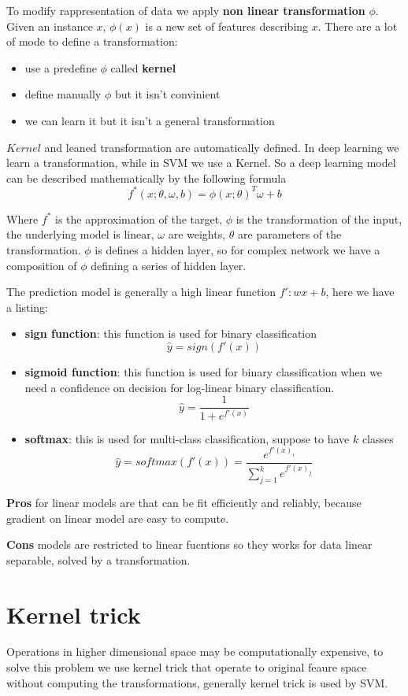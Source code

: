 To modify rappresentation of data we apply \textbf{non linear transformation} $\phi$.
Given an instance $x$, $\phi(x)$ is a new set of features describing $x$. There are 
a lot of mode to define a transformation:
\begin{itemize}
    \item use a predefine $\phi$ called \textbf{kernel}
    \item define manually $\phi$ but it isn't convinient
    \item we can learn it  but it isn't a general transformation
\end{itemize}

$Kernel$ and leaned transformation are automatically defined. In deep learning 
we learn a transformation, while in SVM we use a Kernel. So a deep learning model 
can be described mathematically by the following formula
$$f^*(x;\theta, \omega, b) = \phi(x; \theta)^T \omega + b$$

Where $f^*$ is the approximation of the target, $\phi$ is the transformation of 
the input, the underlying model is linear, $\omega$ are weights, $\theta$ are 
parameters of the transformation. $\phi$ is defines a hidden layer, so for complex 
network we have a composition of $\phi$ defining a series of hidden layer. 

The prediction model is generally a high linear function $f': wx + b$, here we have a listing:
\begin{itemize}
    \item \textbf{sign function}: this function is used for binary classification
    $$\hat{y} = sign(f'(x))$$
    \item \textbf{sigmoid function}: this function is used for binary classification
    when we need a confidence on decision for log-linear binary classification.
    $$\hat{y} = \frac{1}{1+e^{f'(x)}}$$
    \item \textbf{softmax}: this is used for multi-class classification, suppose 
    to have $k$ classes
    $$\hat{y} =softmax(f'(x)) = \frac{e^{f'(x)_i}}{\sum_{j=1}^k e^{f'(x)_j}}$$
\end{itemize}

\textbf{Pros} for linear models are that can be fit efficiently and reliably, because 
gradient on linear model are easy to compute.

\textbf{Cons} models are restricted to linear fucntions so they works for data linear
separable, solved by a transformation.

\section{Kernel trick}
Operations in higher dimensional space may be computationally expensive, to solve 
this problem we use kernel trick that operate to original feaure space without computing 
the transformations, generally kernel trick is used by SVM.

